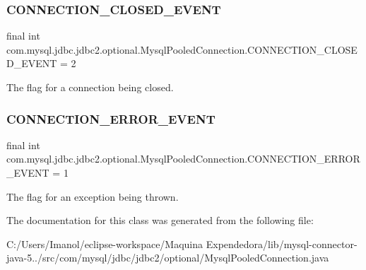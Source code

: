 \subsubsection{\texorpdfstring{C\+O\+N\+N\+E\+C\+T\+I\+O\+N\+\_\+\+C\+L\+O\+S\+E\+D\+\_\+\+E\+V\+E\+NT}{CONNECTION\_CLOSED\_EVENT}}
{\footnotesize\ttfamily final int com.\+mysql.\+jdbc.\+jdbc2.\+optional.\+Mysql\+Pooled\+Connection.\+C\+O\+N\+N\+E\+C\+T\+I\+O\+N\+\_\+\+C\+L\+O\+S\+E\+D\+\_\+\+E\+V\+E\+NT = 2\hspace{0.3cm}{\ttfamily [static]}}

The flag for a connection being closed. \mbox{\label{classcom_1_1mysql_1_1jdbc_1_1jdbc2_1_1optional_1_1_mysql_pooled_connection_a5df937fa6e5151344d5dfff40acc957d}} 
\subsubsection{\texorpdfstring{C\+O\+N\+N\+E\+C\+T\+I\+O\+N\+\_\+\+E\+R\+R\+O\+R\+\_\+\+E\+V\+E\+NT}{CONNECTION\_ERROR\_EVENT}}
{\footnotesize\ttfamily final int com.\+mysql.\+jdbc.\+jdbc2.\+optional.\+Mysql\+Pooled\+Connection.\+C\+O\+N\+N\+E\+C\+T\+I\+O\+N\+\_\+\+E\+R\+R\+O\+R\+\_\+\+E\+V\+E\+NT = 1\hspace{0.3cm}{\ttfamily [static]}}

The flag for an exception being thrown. 

The documentation for this class was generated from the following file\+:\begin{DoxyCompactItemize}
\item 
C\+:/\+Users/\+Imanol/eclipse-\/workspace/\+Maquina Expendedora/lib/mysql-\/connector-\/java-\/5../src/com/mysql/jdbc/jdbc2/optional/Mysql\+Pooled\+Connection.\+java\end{DoxyCompactItemize}

